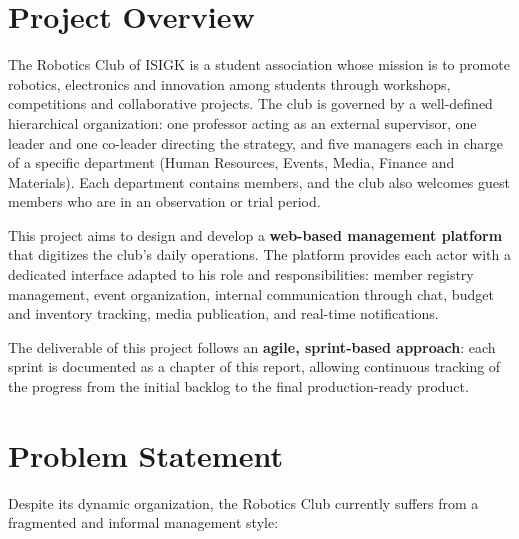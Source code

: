 \documentclass[12pt,a4paper]{report}
\begin{document}
\section{Project Overview}

The Robotics Club of ISIGK is a student association whose mission is to promote robotics,
electronics and innovation among students through workshops, competitions and collaborative
projects. The club is governed by a well-defined hierarchical organization: one professor
acting as an external supervisor, one leader and one co-leader directing the strategy, and
five managers each in charge of a specific department (Human Resources, Events, Media,
Finance and Materials). Each department contains members, and the club also welcomes guest
members who are in an observation or trial period.

This project aims to design and develop a \textbf{web-based management platform} that
digitizes the club's daily operations. The platform provides each actor with a dedicated
interface adapted to his role and responsibilities: member registry management, event
organization, internal communication through chat, budget and inventory tracking, media
publication, and real-time notifications.

The deliverable of this project follows an \textbf{agile, sprint-based approach}: each
sprint is documented as a chapter of this report, allowing continuous tracking of the
progress from the initial backlog to the final production-ready product.

\section{Problem Statement}

Despite its dynamic organization, the Robotics Club currently suffers from a fragmented
and informal management style:
\end{document}
